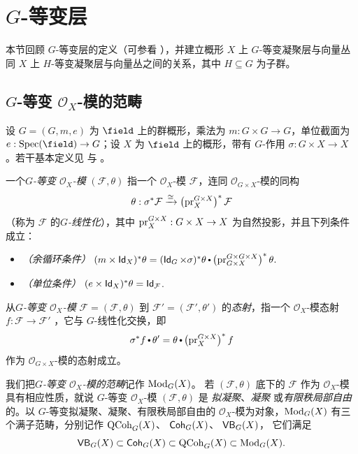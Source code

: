 \section{$G$-等变层\label{sec:G-equiv-sheaves}}
本节回顾 $G$-等变层的定义（可参看 \cite[\href{https://stacks.math.columbia.edu/tag/03LE}{Tag 03LE}]{stacks-project}），并建立概形 $X$ 上 $G$-等变凝聚层与向量丛同 $X$ 上 $H$-等变凝聚层与向量丛之间的关系，其中 $H\subseteq G$ 为子群。

\subsection{$G$-等变 $\mathcal{O}_X$-模的范畴}

设 $G=(G, m, e)$ 为 $\field$ 上的群概形，乘法为 $m : G \times G \rightarrow G$，单位截面为 $e : \Spec(\field) \rightarrow G$；设 $X$ 为 $\field$ 上的概形，带有 $G$-作用 $\sigma : G \times X \rightarrow X$。若干基本定义见 \cite[\href{https://stacks.math.columbia.edu/tag/022R}{Section 022R}]{stacks-project} 与 \cite[\href{https://stacks.math.columbia.edu/tag/01II}{Section 01II}]{stacks-project}。

\begin{defn}\label{defn:EquivariantSheaves}
一个\emph{$G$-等变 $\mathcal{O}_X$-模}
$(\mathcal{F}, \theta)$
指一个 $\mathcal{O}_X$-模 $\mathcal{F}$，连同 $\mathcal{O}_{G\times X}$-模的同构
$$
\theta : \sigma^* \mathcal{F} \xrightarrow{\cong} \left(\operatorname{\operatorname{pr}}_X^{G \times X}\right)^* \mathcal{F}
$$
（称为 $\mathcal{F}$ 的\emph{$G$-线性化}），其中 $\operatorname{\operatorname{pr}}_X^{G \times X} : G \times X \rightarrow X$ 为自然投影，并且下列条件成立：
\begin{itemize}
\item \emph{（余循环条件）}
$
(m \times \id_X)^* \theta
=
(\id_G \times \sigma)^* \theta \comp \left(\pr_{G \times X}^{G \times G \times X}\right)^* \theta.
$

\item \emph{（单位条件）}
$(e \times \operatorname{\mathsf{Id}}_X)^*\theta = \operatorname{\mathsf{Id}}_{\mathcal{F}}$.
\end{itemize}

从\emph{$G$-等变 $\mathcal{O}_X$-模}
$\mathcal{F}=(\mathcal{F}, \theta)$
到
$\mathcal{F}'=(\mathcal{F}', \theta')$
的\emph{态射}，指一个 $\mathcal{O}_X$-模态射
$
f : \mathcal{F} \rightarrow \mathcal{F}'
$
，它与 $G$-线性化交换，即
$$
\sigma^* f \comp \theta'
=
\theta \comp \left(\pr_X^{G \times X}\right)^* f
$$
作为 $\mathcal{O}_{G \times X}$-模的态射成立。

我们把\emph{$G$-等变 $\mathcal{O}_X$-模的范畴}记作
$\operatorname{\mathrm{Mod}}_G(X)$。
若 $(\mathcal{F},\theta)$ 底下的 $\mathcal{F}$ 作为 $\mathcal{O}_X$-模具有相应性质，就说 $G$-等变 $\mathcal{O}_X$-模 $(\mathcal{F},\theta)$ 是
\emph{拟凝聚}、\emph{凝聚}
或\emph{有限秩局部自由}的。以 $G$-等变拟凝聚、凝聚、有限秩局部自由的 $\mathcal{O}_X$-模为对象，$\operatorname{\mathrm{Mod}}_G(X)$ 有三个满子范畴，分别记作
$\operatorname{\mathrm{QCoh}}_G(X)$、
$\operatorname{\mathsf{Coh}}_G(X)$、
$\operatorname{\mathsf{VB}}_G(X)$，
它们满足
$$
\operatorname{\mathsf{VB}}_G(X)\subset\operatorname{\mathsf{Coh}}_G(X)\subset\operatorname{\mathrm{QCoh}}_G(X)\subset\operatorname{\mathrm{Mod}}_G(X).
$$
\end{defn}

